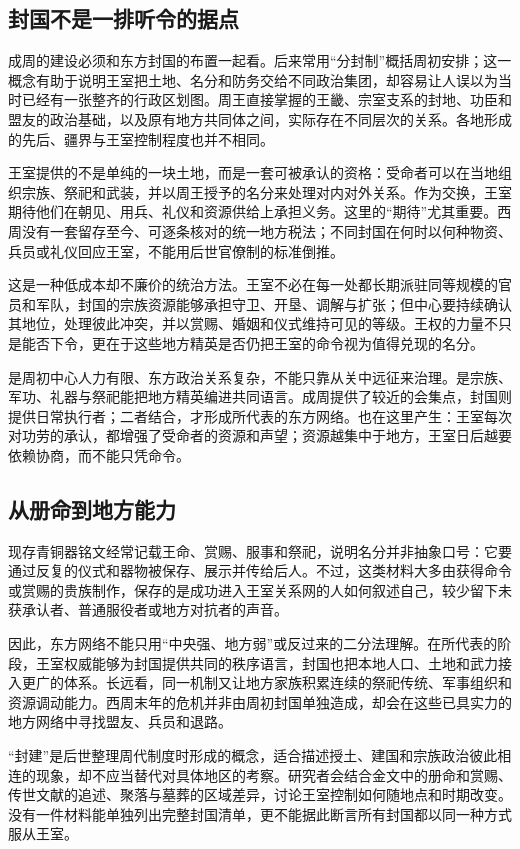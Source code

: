 \subsection{封国不是一排听令的据点}

成周的建设必须和东方封国的布置一起看。后来常用“分封制”概括周初安排；这一概念有助于说明王室把土地、名分和防务交给不同政治集团，却容易让人误以为当时已经有一张整齐的行政区划图。周王直接掌握的王畿、宗室支系的封地、功臣和盟友的政治基础，以及原有地方共同体之间，实际存在不同层次的关系。各地形成的先后、疆界与王室控制程度也并不相同。

王室提供的不是单纯的一块土地，而是一套可被承认的资格：受命者可以在当地组织宗族、祭祀和武装，并以周王授予的名分来处理对内对外关系。作为交换，王室期待他们在朝见、用兵、礼仪和资源供给上承担义务。这里的“期待”尤其重要。西周没有一套留存至今、可逐条核对的统一地方税法；不同封国在何时以何种物资、兵员或礼仪回应王室，不能用后世官僚制的标准倒推。

这是一种低成本却不廉价的统治方法。王室不必在每一处都长期派驻同等规模的官员和军队，封国的宗族资源能够承担守卫、开垦、调解与扩张；但中心要持续确认其地位，处理彼此冲突，并以赏赐、婚姻和仪式维持可见的等级。王权的力量不只是能否下令，更在于这些地方精英是否仍把王室的命令视为值得兑现的名分。

\begin{causalchain}[从东方据点到关系网络]
是周初中心人力有限、东方政治关系复杂，不能只靠从关中远征来治理。是宗族、军功、礼器与祭祀能把地方精英编进共同语言。成周提供了较近的会集点，封国则提供日常执行者；二者结合，才形成所代表的东方网络。也在这里产生：王室每次对功劳的承认，都增强了受命者的资源和声望；资源越集中于地方，王室日后越要依赖协商，而不能只凭命令。
\end{causalchain}

\subsection{从册命到地方能力}

现存青铜器铭文经常记载王命、赏赐、服事和祭祀，说明名分并非抽象口号：它要通过反复的仪式和器物被保存、展示并传给后人。不过，这类材料大多由获得命令或赏赐的贵族制作，保存的是成功进入王室关系网的人如何叙述自己，较少留下未获承认者、普通服役者或地方对抗者的声音。

因此，东方网络不能只用“中央强、地方弱”或反过来的二分法理解。在所代表的阶段，王室权威能够为封国提供共同的秩序语言，封国也把本地人口、土地和武力接入更广的体系。长远看，同一机制又让地方家族积累连续的祭祀传统、军事组织和资源调动能力。西周末年的危机并非由周初封国单独造成，却会在这些已具实力的地方网络中寻找盟友、兵员和退路。

\begin{debate}[“封建”能解释多少]
“封建”是后世整理周代制度时形成的概念，适合描述授土、建国和宗族政治彼此相连的现象，却不应当替代对具体地区的考察。研究者会结合金文中的册命和赏赐、传世文献的追述、聚落与墓葬的区域差异，讨论王室控制如何随地点和时期改变。没有一件材料能单独列出完整封国清单，更不能据此断言所有封国都以同一种方式服从王室。
\end{debate}
